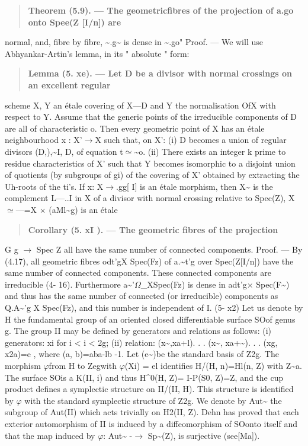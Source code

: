 \documentclass[11pt]{article}
\theoremstyle{plain}
\theoremstyle{definition}
\theoremstyle{remark}
\begin{document}
\begin{quote}\textbf{Theorem (5.9). --- The geometricfibres of the projection of a.go onto Spee(Z [I/n]) are}\end{quote}
normal, and, fibre by fibre, \textasciitilde{}.g\textasciitilde{} is dense in \textasciitilde{}.go" Proof. --- We will use Abhyankar-Artin's lemma, in its " absolute " form:

\begin{quote}\textbf{Lemma (5. xe). --- Let D be a divisor with normal crossings on an excellent regular}\end{quote}
scheme X, Y an \'etale covering of X---D and Y the normalisation OfX with respect to Y. Assume that the generic points of the irreducible components of D are all of characteristic o. Then every geometric point of X has an \'etale neighbourhood x : X'$\to$X such that, on X': (i) D becomes a union of regular divisors (D,),\textasciitilde{}I, D, of equation t$\simeq$\textasciitilde{}o. (ii) There exists an integer k prime to residue characteristics of X' such that Y becomes isomorphic to a disjoint union of quotients (by subgroups of gi) of the covering of X' obtained by extracting the Uh-roots of the ti's. If x: X$\to$.gg[ I] is an \'etale morphism, then X\textasciitilde{} is the complement L---..I in X of a divisor with normal crossing relative to Spec(Z), X $\simeq$---=X $\times$ (aMl\textasciitilde{}g) is an \'etale

\begin{quote}\textbf{Corollary (5. xI ). --- The geometric fibres of the projection}\end{quote}
G g $\to$ Spec Z all have the same number of connected components. Proof. --- By (4.17), all geometric fibres odt'gX Spec(Fz) of a.\textasciitilde{}t'g over Spec(Z[I/n]) have the same number of connected components. These connected components are irreducible (4- 16). Furthermore a\textasciitilde{}'$\Omega$\_XSpec(Fz) is dense in adt'g$\times$ Spec(F\textasciitilde{}) and thus has the same number of connected (or irreducible) components as Q.A\textasciitilde{}'g X Spec(Fz), and this number is independent of I. (5- x2) Let us denote by H the fundamental group of an oriented closed differentiable surface SOof genus g. The group II may be defined by generators and relations as follows: (i) generators: xi for i < i < 2g; (ii) relation: (x\textasciitilde{},xa+l). . . (x\textasciitilde{}, xa+\textasciitilde{}). . . (xg, x2a)=e , where (a, b)=aba-lb -1. Let (e\textasciitilde{})be the standard basis of Z2g. The morphism $\varphi$from H to Zegwith $\varphi$(Xi) = el identifies H/(H, n)=Hl(n, Z) with Z\textasciitilde{}a. The surface SOis a K(II, i) and thus H\textasciicircum{}0(H, Z)= I-P(S0, Z)=Z, and the cup product defines a symplectic structure on II/(II, H). This structure is identified by $\varphi$ with the standard symplectic structure of Z2g. We denote by Aut\textasciitilde{} the subgroup of Aut(II) which acts trivially on H2(II, Z). Dehn has proved that each exterior automorphism of II is induced by a diffeomorphism of SOonto itself and that the map induced by $\varphi$: Aut\textasciitilde{} -$\to$ Sp\textasciitilde{}(Z), is surjective (see[Ma]).
\end{document}

